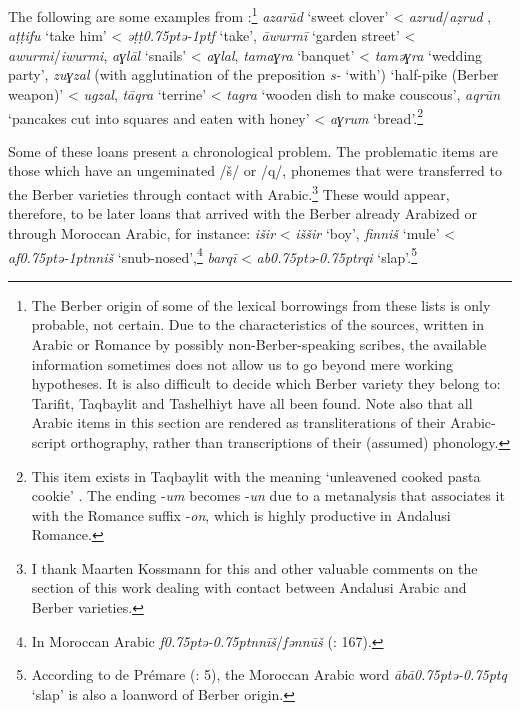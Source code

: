 \documentclass[output=paper,modfonts,nonflat]{langsci/langscibook}
\begin{document}
The following are some examples from \citet{CorrientePereiraVicente2017}:\footnote{The Berber origin of some of the lexical borrowings from these lists is only probable, not certain. Due to the characteristics of the sources, written in Arabic or Romance by possibly non-Berber-speaking scribes, the available information sometimes does not allow us to go beyond mere working hypotheses. It is also difficult to decide which Berber variety they belong to: Tarifit, Taqbaylit and Tashelhiyt have all been found. Note also that all Arabic items in this section are rendered as transliterations of their Arabic-script orthography, rather than transcriptions of their (assumed) phonology.} \textit{azarūd} ‘sweet clover’ < \textit{azrud}/\textit{aẓrud} , \textit{aṭṭifu} ‘take him’ < \textit{ǝṭṭ\kern 0.75ptǝ\kern -1ptf} ‘take’, \textit{āwurmī} ‘garden street’ < \textit{awurmi}/\textit{iwurmi}, \textit{aɣlāl} ‘snails’ < \textit{aɣlal}, \textit{tamaɣra} ‘banquet’ < \textit{tamǝɣra} `wedding party', \textit{zuɣzal} ({with agglutination of the preposition} \textit{s-} ‘with’) ‘half-pike (Berber weapon)’ < \textit{ugzal}, \textit{tāqra} `terrine' < \textit{tagra} `wooden dish to make couscous’, \textit{aqrūn} ‘pancakes cut into squares and eaten with honey’ < \textit{aɣrum} ‘bread’.\footnote{This item exists in Taqbaylit with the meaning ‘unleavened cooked pasta cookie’ \citep{Dallet1982}. The ending -\textit{um} becomes -\textit{un} due to a metanalysis that associates it with the Romance suffix -\textit{on}, which is highly productive in Andalusi Romance.} 

Some of these loans present a chronological problem. The problematic items are those which have an ungeminated /š/ or /q/, phonemes that were transferred to the Berber varieties through contact with Arabic.\footnote{I thank Maarten Kossmann for this and other valuable comments on the section of this work dealing with contact between Andalusi Arabic and Berber varieties.} These would appear, therefore, to be later loans that arrived with the Berber already Arabized or through Moroccan Arabic, for instance: \textit{išir} < \textit{iššir} ‘boy’, \textit{finniš} ‘mule’ < \textit{af\kern 0.75ptǝ\kern -1ptnniš} ‘snub-nosed’,\footnote{In Moroccan Arabic \textit{f\kern 0.75ptǝ\kern -0.75ptnnīš}/\textit{fənnūš} (\citealt{Prémare1998}: 167).}  \textit{barqī} < \textit{ab\kern 0.75ptǝ\kern -0.75ptrqi} ‘slap’.\footnote{According to de Prémare (\citeyear{Prémare1993}: 5), the Moroccan Arabic word \textit{ābā{\R}\kern 0.75ptǝ\kern -0.75ptq} ‘slap’ is also a loanword of Berber origin.}
\end{document}

